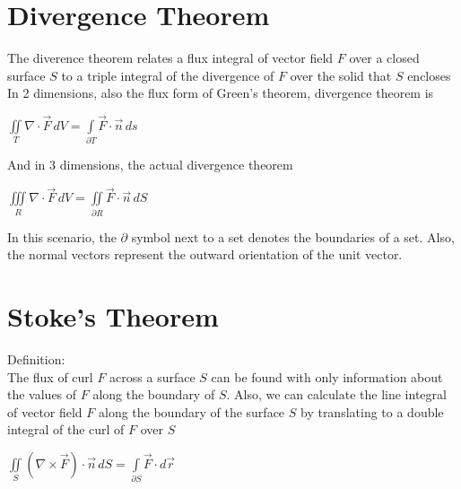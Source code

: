 \documentclass[12pt, letterpaper]{article}
\begin{document}
  \maketitle
  \section*{Divergence Theorem}

  The diverence theorem relates a flux integral of vector field \(F\) over a closed surface \(S\) to a triple integral of the divergence of \(F\) over the solid that \(S\) encloses \\

  \noindent In 2 dimensions, also the flux form of Green's theorem, divergence theorem is
  \begin{center}
    \(\iint \limits_T \nabla \cdot \vec{F}\,dV = \int \limits_{\partial T} \vec{F} \cdot \vec{n} \, ds\)
  \end{center}

  \noindent And in 3 dimensions, the actual divergence theorem
  \begin{center}
    \(\iiint \limits_R \nabla \cdot \vec{F}\,dV = \iint \limits_{\partial R}\vec{F} \cdot \vec{n}\,dS\)
    
  \end{center}

  \noindent In this scenario, the \(\partial\) symbol next to a set denotes the boundaries of a set. Also, the normal vectors represent the outward orientation of the unit vector.

\pagebreak

\section*{Stoke's Theorem}

Definition: \\
The flux of curl \(F\) across a surface \(S\) can be found with only information about the values of \(F\) along the boundary of \(S\). Also, we can calculate the line integral of vector field \(F\) along the boundary of the surface \(S\) by translating to a double integral of the curl of \(F\) over \(S\)

\begin{center}
  \(\iint \limits_S (\nabla \times \vec{F}) \cdot \vec{n} \, dS = \int \limits_{\partial S} \vec{F} \cdot d\vec{r}\)
\end{center}
\end{document}
